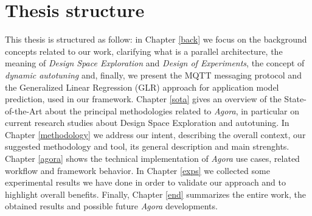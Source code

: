 \section{Thesis structure}

This thesis is structured as follow: in Chapter \ref{back} we focus on the background concepts related to our work, clarifying what is a parallel architecture, the meaning of \textit{Design Space Exploration} and \textit{Design of Experiments}, the concept of \textit{dynamic autotuning} and, finally, we present the MQTT messaging protocol and the Generalized Linear Regression (GLR) approach for application model prediction, used in our framework. Chapter \ref{sota} gives an overview of the State-of-the-Art about the principal methodologies related to \textit{Agora}, in particular on current research studies about Design Space Exploration and autotuning. In Chapter \ref{methodology} we address our intent, describing the overall context, our suggested methodology and tool, its general description and main strenghts. Chapter \ref{agora} shows the technical implementation of \textit{Agora} use cases, related workflow and framework behavior. In Chapter \ref{exps} we collected some experimental results we have done in order to validate our approach and to highlight overall benefits. Finally, Chapter \ref{end} summarizes the entire work, the obtained results and possible future \textit{Agora} developments.
